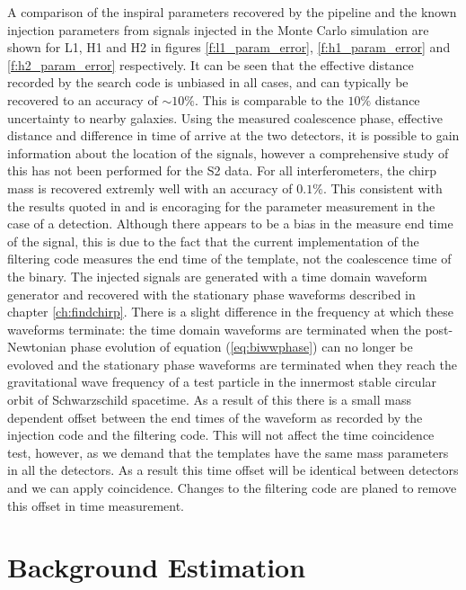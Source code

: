 A comparison of the inspiral parameters recovered by the pipeline and the
known injection parameters from signals injected in the Monte Carlo simulation
are shown for L1, H1 and H2 in figures \ref{f:l1_param_error},
\ref{f:h1_param_error} and \ref{f:h2_param_error} respectively. It can be seen
that the effective distance recorded by the search code is unbiased in all
cases, and can typically be recovered to an accuracy of $\sim 10\%$. This is
comparable to the $10\%$ distance uncertainty to nearby galaxies.  Using the
measured coalescence phase, effective distance and difference in time of
arrive at the two detectors, it is possible to gain information about the
location of the signals, however a comprehensive study of this has not been
performed for the S2 data. For all interferometers, the chirp mass is
recovered extremly well with an accuracy of $0.1\%$. This consistent with the
results quoted in \cite{Cutler:1994} and is encoraging for the parameter
measurement in the case of a detection. Although there appears to be a bias in
the measure end time of the signal, this is due to the fact that the current
implementation of the filtering code measures the end time of the template,
not the coalescence time of the binary. The injected signals are generated
with a time domain waveform generator\cite{LAL} and recovered with the
stationary phase waveforms described in chapter \ref{ch:findchirp}. There is a
slight difference in the frequency at which these waveforms terminate: the
time domain waveforms are terminated when the post-Newtonian phase evolution
of equation (\ref{eq:biwwphase}) can no longer be evoloved and the stationary
phase waveforms are terminated when they reach the gravitational wave
frequency of a test particle in the innermost stable circular orbit of
Schwarzschild spacetime. As a result of this there is a small mass dependent
offset between the end times of the waveform as recorded by the injection code
and the filtering code. This will not affect the time coincidence test,
however, as we demand that the templates have the same mass parameters
in all the detectors. As a result this time offset will be identical between
detectors and we can apply coincidence. Changes to the filtering code are
planed to remove this offset in time measurement.

\section{Background Estimation}
\label{s:s2background}

